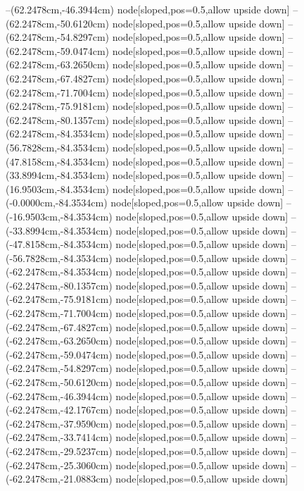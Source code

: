 --(62.2478cm,-46.3944cm) node[sloped,pos=0.5,allow upside down]{\ArrowIn}
--(62.2478cm,-50.6120cm) node[sloped,pos=0.5,allow upside down]{\ArrowIn}
--(62.2478cm,-54.8297cm) node[sloped,pos=0.5,allow upside down]{\ArrowIn}
--(62.2478cm,-59.0474cm) node[sloped,pos=0.5,allow upside down]{\ArrowIn}
--(62.2478cm,-63.2650cm) node[sloped,pos=0.5,allow upside down]{\ArrowIn}
--(62.2478cm,-67.4827cm) node[sloped,pos=0.5,allow upside down]{\ArrowIn}
--(62.2478cm,-71.7004cm) node[sloped,pos=0.5,allow upside down]{\ArrowIn}
--(62.2478cm,-75.9181cm) node[sloped,pos=0.5,allow upside down]{\ArrowIn}
--(62.2478cm,-80.1357cm) node[sloped,pos=0.5,allow upside down]{\ArrowIn}
--(62.2478cm,-84.3534cm) node[sloped,pos=0.5,allow upside down]{\ArrowIn}
--(56.7828cm,-84.3534cm) node[sloped,pos=0.5,allow upside down]{\ArrowIn}
--(47.8158cm,-84.3534cm) node[sloped,pos=0.5,allow upside down]{\ArrowIn}
--(33.8994cm,-84.3534cm) node[sloped,pos=0.5,allow upside down]{\ArrowIn}
--(16.9503cm,-84.3534cm) node[sloped,pos=0.5,allow upside down]{\ArrowIn}
--(-0.0000cm,-84.3534cm) node[sloped,pos=0.5,allow upside down]{\ArrowIn}
--(-16.9503cm,-84.3534cm) node[sloped,pos=0.5,allow upside down]{\ArrowIn}
--(-33.8994cm,-84.3534cm) node[sloped,pos=0.5,allow upside down]{\ArrowIn}
--(-47.8158cm,-84.3534cm) node[sloped,pos=0.5,allow upside down]{\ArrowIn}
--(-56.7828cm,-84.3534cm) node[sloped,pos=0.5,allow upside down]{\ArrowIn}
--(-62.2478cm,-84.3534cm) node[sloped,pos=0.5,allow upside down]{\ArrowIn}
--(-62.2478cm,-80.1357cm) node[sloped,pos=0.5,allow upside down]{\ArrowIn}
--(-62.2478cm,-75.9181cm) node[sloped,pos=0.5,allow upside down]{\ArrowIn}
--(-62.2478cm,-71.7004cm) node[sloped,pos=0.5,allow upside down]{\ArrowIn}
--(-62.2478cm,-67.4827cm) node[sloped,pos=0.5,allow upside down]{\ArrowIn}
--(-62.2478cm,-63.2650cm) node[sloped,pos=0.5,allow upside down]{\ArrowIn}
--(-62.2478cm,-59.0474cm) node[sloped,pos=0.5,allow upside down]{\ArrowIn}
--(-62.2478cm,-54.8297cm) node[sloped,pos=0.5,allow upside down]{\ArrowIn}
--(-62.2478cm,-50.6120cm) node[sloped,pos=0.5,allow upside down]{\ArrowIn}
--(-62.2478cm,-46.3944cm) node[sloped,pos=0.5,allow upside down]{\ArrowIn}
--(-62.2478cm,-42.1767cm) node[sloped,pos=0.5,allow upside down]{\ArrowIn}
--(-62.2478cm,-37.9590cm) node[sloped,pos=0.5,allow upside down]{\ArrowIn}
--(-62.2478cm,-33.7414cm) node[sloped,pos=0.5,allow upside down]{\ArrowIn}
--(-62.2478cm,-29.5237cm) node[sloped,pos=0.5,allow upside down]{\ArrowIn}
--(-62.2478cm,-25.3060cm) node[sloped,pos=0.5,allow upside down]{\ArrowIn}
--(-62.2478cm,-21.0883cm) node[sloped,pos=0.5,allow upside down]{\ArrowIn}
